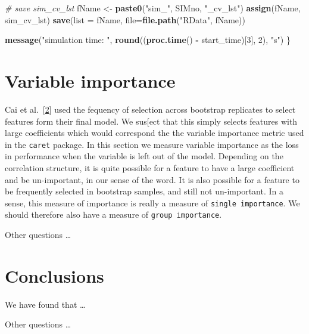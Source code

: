 \documentclass[
]{book}
\newenvironment{Shaded}{\begin{snugshade}}{\end{snugshade}}
\newcommand{\CommentTok}[1]{\textcolor[rgb]{0.56,0.35,0.01}{\textit{#1}}}
\newcommand{\DataTypeTok}[1]{\textcolor[rgb]{0.13,0.29,0.53}{#1}}
\newcommand{\DecValTok}[1]{\textcolor[rgb]{0.00,0.00,0.81}{#1}}
\newcommand{\KeywordTok}[1]{\textcolor[rgb]{0.13,0.29,0.53}{\textbf{#1}}}
\newcommand{\NormalTok}[1]{#1}
\newcommand{\OperatorTok}[1]{\textcolor[rgb]{0.81,0.36,0.00}{\textbf{#1}}}
\newcommand{\StringTok}[1]{\textcolor[rgb]{0.31,0.60,0.02}{#1}}
\begin{document}
\begin{Shaded}
\begin{Highlighting}[]
  \CommentTok{\# save  sim\_cv\_lst}
\NormalTok{  fName <{-}}\StringTok{ }\KeywordTok{paste0}\NormalTok{(}\StringTok{"sim\_"}\NormalTok{, SIMno, }\StringTok{"\_cv\_lst"}\NormalTok{)}
  \KeywordTok{assign}\NormalTok{(fName, sim\_cv\_lst)}
  \KeywordTok{save}\NormalTok{(}\DataTypeTok{list =}\NormalTok{ fName, }\DataTypeTok{file=}\KeywordTok{file.path}\NormalTok{(}\StringTok{"RData"}\NormalTok{, fName))}

  \KeywordTok{message}\NormalTok{(}\StringTok{"simulation time: "}\NormalTok{, }\KeywordTok{round}\NormalTok{((}\KeywordTok{proc.time}\NormalTok{() }\OperatorTok{{-}}\StringTok{ }\NormalTok{start\_time)[}\DecValTok{3}\NormalTok{], }\DecValTok{2}\NormalTok{), }\StringTok{"s"}\NormalTok{)}
\NormalTok{\}}
\end{Highlighting}
\end{Shaded}

\hypertarget{variable-importance}{%
\chapter{Variable importance}\label{variable-importance}}

Cai et al.~{[}\protect\hyperlink{ref-Cai:2019aa}{2}{]} used the fequency of selection across
bootstrap replicates to select features form their final model.
We sus{[}ect that this simply selects features with large coefficients
which would correspond the the variable importance metric
used in the \texttt{caret} package. In this section we measure
variable importance as the loss in performance when the variable is left out
of the model. Depending on the correlation structure, it is quite possible
for a feature to have a large coefficient and be un-important, in our sense of the word.
It is also possible for a feature to be frequently selected in bootstrap samples, and
still not un-important. In a sense, this measure of importance is really a measure
of \texttt{single\ importance}. We should therefore also have a measure of \texttt{group\ importance}.

Other questions \ldots{}

\hypertarget{conclusions}{%
\chapter{Conclusions}\label{conclusions}}

We have found that \ldots{}

Other questions \ldots{}
\end{document}
